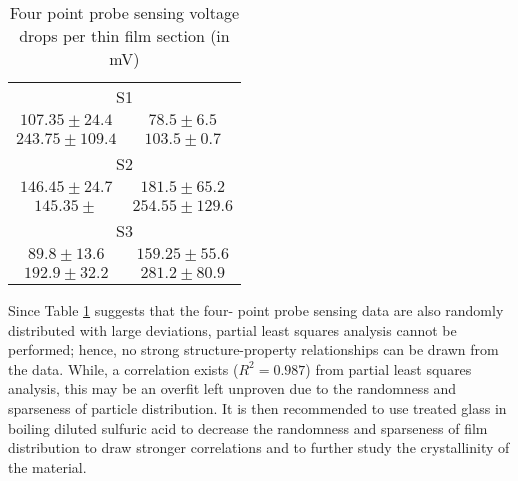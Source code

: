 \begin{table}
  \centering
  \begin{tabular}{c c}
    \toprule
    \multicolumn{2}{c}{S1} \\
    $107.35\pm 24.4$ & $78.5\pm 6.5$ \\
    $243.75\pm 109.4$ & $103.5\pm 0.7$ \\
    \multicolumn{2}{c}{S2} \\
    \midrule
    $146.45 \pm 24.7$ & $181.5\pm 65.2$ \\
    $145.35\pm$ & $254.55\pm 129.6$ \\
    \multicolumn{2}{c}{S3} \\
    \midrule
    $89.8\pm 13.6$ & $159.25\pm 55.6$ \\
    $192.9\pm 32.2$ & $281.2\pm 80.9$ \\
    \bottomrule
  \end{tabular}
  \caption[Four point probe sensing results]{Four point probe sensing voltage drops per thin film section (in mV)}
  \label{tab:fpsr}
\end{table}

Since Table \ref{tab:fpsr} suggests that the four- point probe sensing data are also randomly distributed with large deviations, partial least squares analysis cannot be performed; hence, no strong structure-property relationships can be drawn from the data.
While, a correlation exists ($R^2 = 0.987$) from partial least squares analysis, this may be an overfit left unproven due to the randomness and sparseness of particle distribution.
It is then recommended to use treated glass in boiling diluted sulfuric acid to decrease the randomness and sparseness of film distribution \cite{gao08} to draw stronger correlations \cite{delin} and to further study the crystallinity of the material.
